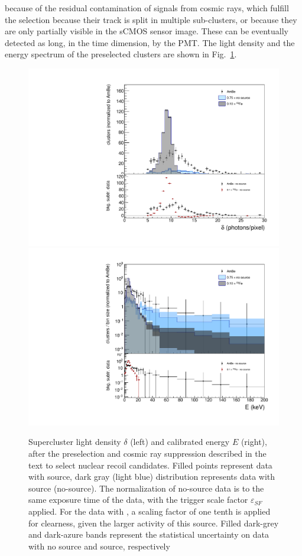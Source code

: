 because of the residual contamination of signals from cosmic rays,
which fulfill the selection because their track is split in multiple
sub-clusters, or because they are only partially visible in the sCMOS
sensor image. These can be eventually detected as long, in the time
dimension, by the PMT.  The light density and the energy spectrum of
the preselected clusters are shown in Fig.~\ref{fig:presel}.
%
\begin{figure}[ht]
  \begin{center}
  \includegraphics[width=0.45\linewidth]{figures/density_fullSel}
  \includegraphics[width=0.45\linewidth]{figures/energy_fullSel}

  \caption{Supercluster light density $\delta$ (left) and calibrated
    energy $E$ (right), after the preselection and cosmic ray
    suppression described in the text to select nuclear recoil
    candidates. Filled points represent data with \ambe source, dark
    gray (light blue) distribution represents data with \fe source
    (no-source).  The normalization of no-source data is to the same
    exposure time of the \ambe data, with the trigger scale factor
    $\varepsilon_{SF}$ applied. For the data with \fe, a scaling
    factor of one tenth is applied for clearness, given the larger
    activity of this source. Filled dark-grey and dark-azure
    bands represent the statistical uncertainty on data with no source
    and \fe source, respectively \label{fig:presel}}

  \end{center}
\end{figure}



